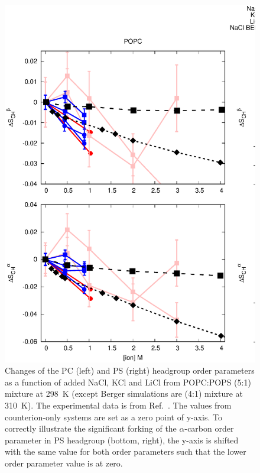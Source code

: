 \documentclass[journal=jpcbfk,manuscript=article]{achemso}
\begin{document}
\begin{figure}[]
  \centering
  \includegraphics[width=17.0cm]{../Figs/CHANGESwithMONVALENTwithPS.eps}
  \caption{\label{PSresponseTONaCl}
    Changes of the PC (left) and PS (right) headgroup order parameters as a function of
    added NaCl, KCl and LiCl from POPC:POPS (5:1) mixture at 298~K
    (except Berger simulations are (4:1) mixture at 310~K).
    The experimental data is from Ref.~.
    The values from counterion-only systems are set as a zero point of y-axis.
    To correctly illustrate the significant forking of the $\alpha$-carbon order parameter
    in PS headgroup (bottom, right), the y-axis is shifted with the same value for both order parameters such that the lower order
    parameter value is at zero.
  }
\end{figure}
\end{document}
